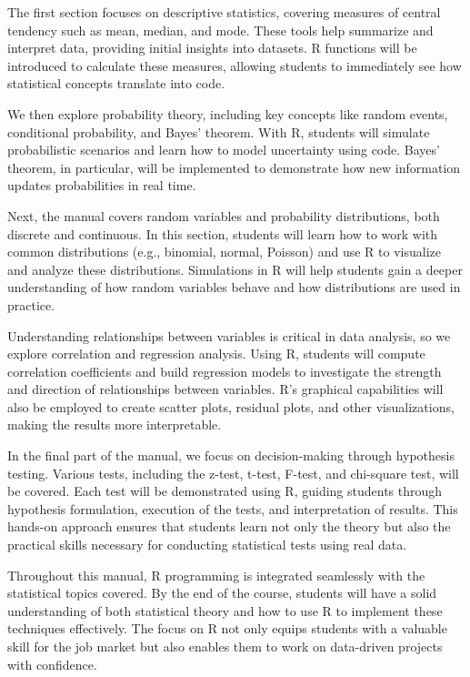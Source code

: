 \documentclass[12pt]{book}
\begin{document}
The first section focuses on descriptive statistics, covering measures of central tendency such as mean, median, and mode. These tools help summarize and interpret data, providing initial insights into datasets. R functions will be introduced to calculate these measures, allowing students to immediately see how statistical concepts translate into code.

We then explore probability theory, including key concepts like random events, conditional probability, and Bayes’ theorem. With R, students will simulate probabilistic scenarios and learn how to model uncertainty using code. Bayes’ theorem, in particular, will be implemented to demonstrate how new information updates probabilities in real time.

Next, the manual covers random variables and probability distributions, both discrete and continuous. In this section, students will learn how to work with common distributions (e.g., binomial, normal, Poisson) and use R to visualize and analyze these distributions. Simulations in R will help students gain a deeper understanding of how random variables behave and how distributions are used in practice.

Understanding relationships between variables is critical in data analysis, so we explore correlation and regression analysis. Using R, students will compute correlation coefficients and build regression models to investigate the strength and direction of relationships between variables. R’s graphical capabilities will also be employed to create scatter plots, residual plots, and other visualizations, making the results more interpretable.

In the final part of the manual, we focus on decision-making through hypothesis testing. Various tests, including the z-test, t-test, F-test, and chi-square test, will be covered. Each test will be demonstrated using R, guiding students through hypothesis formulation, execution of the tests, and interpretation of results. This hands-on approach ensures that students learn not only the theory but also the practical skills necessary for conducting statistical tests using real data.

Throughout this manual, R programming is integrated seamlessly with the statistical topics covered. By the end of the course, students will have a solid understanding of both statistical theory and how to use R to implement these techniques effectively. The focus on R not only equips students with a valuable skill for the job market but also enables them to work on data-driven projects with confidence.
\end{document}
